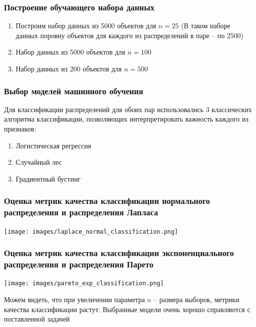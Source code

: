 \documentclass[a4paper,12pt]{article}
\begin{document}
\subsubsection{Построение обучающего набора данных}
\begin{enumerate}
    \item Построим набор данных из 5000 объектов для $n = 25$ (В таком наборе данных поровну объектов для каждого из распределений в паре -- по 2500)

    \item Набор данных из 5000 объектов для $n = 100$

    \item Набор данных из 200 объектов для $n = 500$
\end{enumerate}

\subsubsection{Выбор моделей машинного обучения}
Для классификации распределений для обоих пар использовались 3 классических алгоритма классификации, позволяющих интерпретировать важность каждого из признаков:
\begin{enumerate}
    \item Логистическая регрессия
    \item Случайный лес
    \item Градиентный бустинг
\end{enumerate}

\subsubsection{Оценка метрик качества классификации нормального распределения и распределения Лапласа}
\begin{center}
    \texttt{[image: images/laplace\_normal\_classification.png]}
\end{center}

\subsubsection{Оценка метрик качества классификации экспоненциального распределения и распределения Парето}
\begin{center}
    \texttt{[image: images/pareto\_exp\_classification.png]}
\end{center}



Можем видеть, что при увеличении параметра $n$ -- размера выборок, метрики качества классификации растут. Выбранные модели очень хорошо справляются с поставленной задачей
\end{document}
